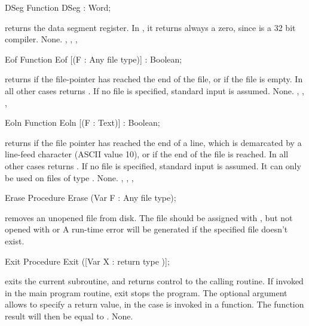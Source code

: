 \documentclass{report}
\begin{document}
\html{}
\begin{function}{DSeg}
\Declaration
Function DSeg  : Word;

\Description
{} returns the data segment register. In \fpc, it returns always a
zero, since \fpc is a 32 bit compiler.
\Errors
None.
\SeeAlso
{}, , , 
\end{function}
\html{}
\begin{function}{Eof}
\Declaration
Function Eof [(F : Any file type)] : Boolean;

\Description
{} returns  if the file-pointer has reached the end of the
file, or if the file is empty. In all other cases  returns
.
If no file  is specified, standard input is assumed.
\Errors
None.
\SeeAlso
{}, , , 
\end{function}
\html{}
\begin{function}{Eoln}
\Declaration
Function Eoln [(F : Text)] : Boolean;

\Description
{} returns  if the file pointer has reached the end of a
line, which is demarcated by a line-feed character (ASCII value 10), or if
the end of the file is reached.
In all other cases  returns .
If no file  is specified, standard input is assumed.
It can only be used on files of type .
\Errors
None.
\SeeAlso
{}, , , 
\end{function}
\html{}
\begin{procedure}{Erase}
\Declaration
Procedure Erase (Var F : Any file type);

\Description
{} removes an unopened file from disk. The file should be
assigned with , but not opened with  or 
\Errors
A run-time error will be generated if the specified file doesn't exist.
\SeeAlso
{}
\end{procedure}
\html{}
\begin{procedure}{Exit}
\Declaration
Procedure Exit ([Var X : return type )];

\Description
{} exits the current subroutine, and returns control to the calling
routine. If invoked in the main program routine, exit stops the program.
The optional argument  allows to specify a return value, in the case
 is invoked in a function. The function result will then be
equal to .
\Errors
None.
\SeeAlso
{}
\end{procedure}
\end{document}
